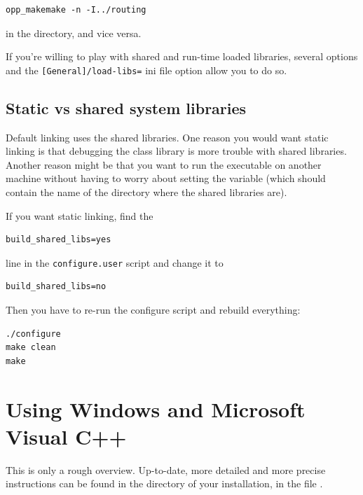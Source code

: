 \begin{verbatim}
opp_makemake -n -I../routing
\end{verbatim}

in the  directory, and vice versa.

If you're willing to play with shared and run-time loaded libraries,
several  options and the
\texttt{[General]/load-libs=} ini file option allow you to do so.





\subsection{Static vs shared {\opp} system libraries}

Default linking uses the shared libraries. One
reason you would want static linking is that
debugging the {\opp} class library is more trouble
with shared libraries. Another reason might be that you want to run
the executable on another machine without having to worry about
setting the  variable (which should contain the name
of the directory where the {\opp} shared libraries are).

If you want static linking, find the

\begin{verbatim}
build_shared_libs=yes
\end{verbatim}


line in the \texttt{configure.user} script and change it to

\begin{verbatim}
build_shared_libs=no
\end{verbatim}

Then you have to re-run the configure script and rebuild everything:

\begin{verbatim}
./configure
make clean
make
\end{verbatim}



\section{Using Windows and Microsoft Visual C++}

This is only a rough overview. Up-to-date, more detailed and more
precise instructions can be found in the  directory
of your {\opp} installation, in the file .



